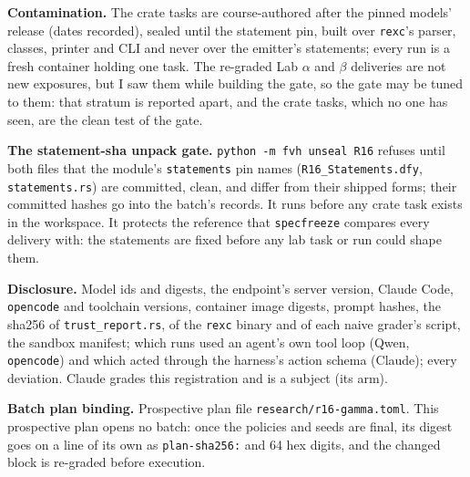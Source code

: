 \documentclass[11pt]{article}
\begin{document}
\begin{answer}
\textbf{Contamination.} The crate tasks are course-authored after the pinned
models' release (dates recorded), sealed until the statement pin, built over
\texttt{rexc}'s parser, classes, printer and CLI and never over the emitter's
statements; every run is a fresh container holding one task. The re-graded
Lab $\alpha$ and $\beta$ deliveries are not new exposures, but I saw them while
building the gate, so the gate may be tuned to them: that stratum is reported
apart, and the crate tasks, which no one has seen, are the clean test of the
gate.

\textbf{The statement-sha unpack gate.} \texttt{python -m fvh unseal R16}
refuses until both files that the module's \texttt{statements} pin names
(\texttt{R16\_Statements.dfy}, \texttt{statements.rs}) are committed, clean,
and differ from their shipped forms; their committed hashes go into the batch's
records. It runs before any crate task exists in the workspace. It protects the
reference that \texttt{specfreeze} compares every delivery with: the
statements are fixed before any lab task or run could shape them.

\textbf{Disclosure.} Model ids and digests, the endpoint's server version,
Claude Code, \texttt{opencode} and toolchain versions, container image digests,
prompt hashes, the sha256 of \texttt{trust\_report.rs}, of the \texttt{rexc}
binary and of each naive grader's script, the sandbox manifest; which runs used
an agent's own tool loop (Qwen, \texttt{opencode}) and which acted through the
harness's action schema (Claude); every deviation. Claude grades this
registration and is a subject (its arm).

\textbf{Batch plan binding.} Prospective plan file
\texttt{research/r16-gamma.toml}. This prospective plan opens no batch: once
the policies and seeds are final, its digest goes on a line of its own as
\texttt{plan-sha256:} and 64 hex digits, and the changed block is re-graded
before execution.
\end{answer}
\end{document}
